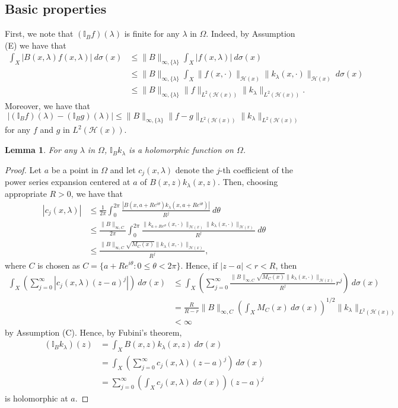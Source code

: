 \documentclass[12pt]{article}
\newtheorem{lem}[thm]{Lemma}
\numberwithin{equation}{section}
\newcommand{\bI}{{\mathbb I}}
\newcommand{\cH}{{\mathcal H}}
\newcommand{\lam}{\lambda}
\begin{document}
\subsection{Basic properties}

First, we note that $(\bI_B f)(\lam)$ is finite for any $\lam$ in $\Omega$. 
Indeed, by Assumption (E)  we have that
\begin{align*}
\int_X|B(x,\lam)f(x,\lam)|\ d\sigma(x)
&\leq \|B\|_{\infty,\{\lam\}}\int_X|f(x,\lam)|\ d\sigma(x)\\
&\leq \|B\|_{\infty,\{\lam\}}\int_X\|f(x,\cdot)\|_{\cH(x)}\|k_{\lam}(x,\cdot)\|_{\cH(x)}\ d\sigma(x)\\
&\leq \|B\|_{\infty,\{\lam\}}\|f\|_{L^2(\cH(x))}\|k_{\lam}\|_{L^2(\cH(x))}.
\end{align*}
Moreover, we have that
\begin{equation}\label{eq:2-1}
|(\bI_B f)(\lam)-(\bI_B g)(\lam)|\leq \|B\|_{\infty,\{\lam\}}\|f-g\|_{L^2(\cH(x))}\|k_{\lam}\|_{L^2(\cH(x))}
\end{equation}
for any $f$ and $g$ in $L^2(\cH(x))$. 

\begin{lem}\label{lem:1-2-0}
For any $\lam$ in $\Omega$, $\bI_B k_{\lam}$ is a holomorphic function on $\Omega$. 
\end{lem}

\begin{proof}
Let $a$ be a point in $\Omega$ and 
let $c_j(x,\lam)$ denote the $j$-th coefficient of the power series expansion centered at $a$ of $B(x,z)k_{\lam}(x,z)$. 
Then, 
choosing appropriate $R>0$, 
we have that 
\begin{align*}
|c_j(x,\lam)|
&\leq \frac{1}{2\pi}\int_0^{2\pi}\frac{|B(x,a+Re^{i\theta})k_{\lam}(x,a+Re^{i\theta})|}{R^j}\ d\theta\\
&\leq \frac{\|B\|_{\infty,C}}{2\pi}\int_0^{2\pi}\frac{\|k_{a+Re^{i\theta}}(x,\cdot)\|_{\cH(x)}\|k_{\lam}(x,\cdot)\|_{\cH(x)}}{R^j}\ d\theta\\
&\leq \frac{\|B\|_{\infty,C}\sqrt{M_C(x)}\|k_{\lam}(x,\cdot)\|_{\cH(x)}}{R^j},
\end{align*}
where $C$ is chosen as $C=\{a+Re^{i\theta}:0\leq \theta <2\pi\}$.
Hence, if $|z-a|<r<R$, then
\begin{align*}
\int_X \left(\sum_{j=0}^{\infty}|c_j(x,\lam)(z-a)^j|\right)\ d\sigma(x)
&\leq \int_X \left(\sum_{j=0}^{\infty}\frac{\|B\|_{\infty,C}\sqrt{M_C(x)}\|k_{\lam}(x,\cdot)\|_{\cH(x)}}{R^j}r^j\right)\ d\sigma(x)\\
&=\frac{R}{R-r}\|B\|_{\infty,C}\left(\int_X M_C(x)\ d\sigma(x)\right)^{1/2}\|k_{\lam}\|_{L^2(\cH(x))}\\
&<\infty
\end{align*}
by Assumption (C). 
Hence, by Fubini's theorem, 
\begin{align*}
(\bI_B k_{\lam})(z)
&=\int_X B(x,z)k_{\lam}(x,z)\ d\sigma(x)\\
&=\int_X \left(\sum_{j=0}^{\infty}c_j(x,\lam)(z-a)^j\right)\ d\sigma(x)\\
&=\sum_{j=0}^{\infty}\left(\int_X c_j(x,\lam)\ d\sigma(x) \right)(z-a)^j
\end{align*}
is holomorphic at $a$. 
\end{proof}
\end{document}
